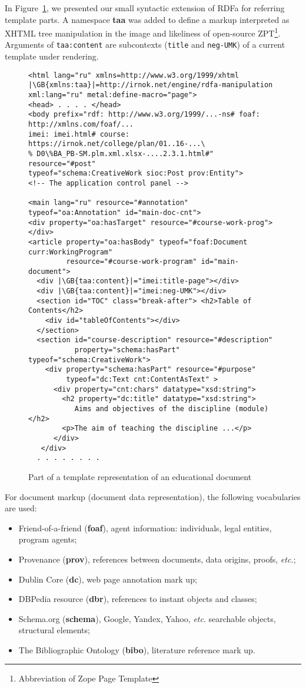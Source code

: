 \documentclass[a4paper]{jctart19a}
\newcommand{\GB}[1]{\colorbox{green}{#1}}
\begin{document}
In Figure~\ref{fig:auth-code}, we presented our small syntactic extension of RDFa for referring template parts.  A namespace \textbf{taa} was added to define a markup interpreted as XHTML tree manipulation in the image and likeliness of open-source ZPT\footnote{Abbreviation of Zope Page Template}.  Arguments of \verb|taa:content| are subcontexts (\verb|title| and \verb|neg-UMK|) of a current template under rendering.
\begin{figure}[!b]
  \centering
\begin{verbatim}
<html lang="ru" xmlns=http://www.w3.org/1999/xhtml
|\GB{xmlns:taa}|=http://irnok.net/engine/rdfa-manipulation
xml:lang="ru" metal:define-macro="page">
<head> . . . . </head>
<body prefix="rdf: http://www.w3.org/1999/...-ns# foaf: http://xmlns.com/foaf/...
imei: imei.html# course: https://irnok.net/college/plan/01..16-...\
% D0\%BA_PB-SM.plm.xml.xlsx-....2.3.1.html#"  resource="#post"
typeof="schema:CreativeWork sioc:Post prov:Entity">
<!-- The application control panel -->

<main lang="ru" resource="#annotation" typeof="oa:Annotation" id="main-doc-cnt">
<div property="oa:hasTarget" resource="#course-work-prog"></div>
<article property="oa:hasBody" typeof="foaf:Document curr:WorkingProgram"
         resource="#course-work-program" id="main-document">
  <div |\GB{taa:content}|="imei:title-page"></div>
  <div |\GB{taa:content}|="imei:neg-UMK"></div>
  <section id="TOC" class="break-after"> <h2>Table of Contents</h2>
    <div id="tableOfContents"></div>
  </section>
  <section id="course-description" resource="#description"
           property="schema:hasPart" typeof="schema:CreativeWork">
    <div property="schema:hasPart" resource="#purpose"
         typeof="dc:Text cnt:ContentAsText" >
      <div property="cnt:chars" datatype="xsd:string">
        <h2 property="dc:title" datatype="xsd:string">
           Aims and objectives of the discipline (module)</h2>
        <p>The aim of teaching the discipline ...</p>
      </div>
   </div>
  . . . . . . . .
\end{verbatim}
  \caption{Part of a template representation of an educational document}
  \label{fig:auth-code}
\end{figure}

For document markup (document data representation), the following vocabularies are used:
\begin{itemize}
  \item Friend-of-a-friend (\textbf{foaf}), agent information: individuals, legal entities, program agents;
  \item Provenance (\textbf{prov}), references between documents, data origins, proofs, \emph{etc.};
  \item Dublin Core (\textbf{dc}), web page annotation mark up;
  \item DBPedia resource (\textbf{dbr}), references to instant objects and classes;
  \item Schema.org (\textbf{schema}), Google, Yandex, Yahoo, \emph{etc}. searchable objects, structural elements;
  \item The Bibliographic Ontology (\textbf{bibo}), literature reference mark up.
\end{itemize}
\end{document}
